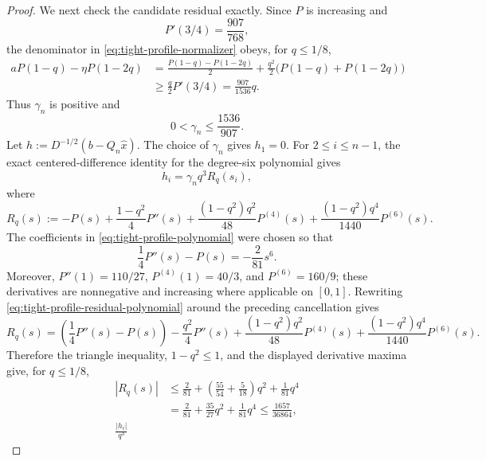 \begin{proof}
We next check the candidate residual exactly.  Since $P$ is increasing and
\begin{equation*}
 P'(3/4)=\frac{907}{768},
\end{equation*}
the denominator in \cref{eq:tight-profile-normalizer} obeys, for $q\leq1/8$,
\begin{align*}
 aP(1-q)-\eta P(1-2q)
 &=\frac{P(1-q)-P(1-2q)}2
   +\frac{q^2}{2}\bigl(P(1-q)+P(1-2q)\bigr)\\
 &\geq\frac q2P'(3/4)=\frac{907}{1536}q.
\end{align*}
Thus $\gamma_n$ is positive and
\begin{equation}
 0<\gamma_n\leq\frac{1536}{907}.
 \label{eq:tight-profile-normalizer-bound}
\end{equation}
Let $h:=D^{-1/2}(b-Q_n\widehat x)$.  The choice of $\gamma_n$ gives
$h_1=0$.  For $2\leq i\leq n-1$, the exact centered-difference identity for
the degree-six polynomial gives
\begin{equation}
 h_i=\gamma_n q^3R_q(s_i),
 \label{eq:tight-profile-interior-residual}
\end{equation}
where
\begin{equation}
 R_q(s):=-P(s)+\frac{1-q^2}{4}P''(s)
       +\frac{(1-q^2)q^2}{48}P^{(4)}(s)
       +\frac{(1-q^2)q^4}{1440}P^{(6)}(s).
 \label{eq:tight-profile-residual-polynomial}
\end{equation}
The coefficients in \cref{eq:tight-profile-polynomial} were chosen so that
\begin{equation*}
 \frac14P''(s)-P(s)=-\frac2{81}s^6.
\end{equation*}
Moreover,
$P''(1)=110/27$, $P^{(4)}(1)=40/3$, and $P^{(6)}=160/9$;
these derivatives are nonnegative and increasing where applicable on
$[0,1]$.  Rewriting \cref{eq:tight-profile-residual-polynomial} around the
preceding cancellation gives
\begin{equation*}
 R_q(s)=\left(\frac14P''(s)-P(s)\right)
       -\frac{q^2}{4}P''(s)
       +\frac{(1-q^2)q^2}{48}P^{(4)}(s)
       +\frac{(1-q^2)q^4}{1440}P^{(6)}(s).
\end{equation*}
Therefore the triangle inequality, $1-q^2\leq1$, and the displayed
derivative maxima give, for $q\leq1/8$,
\begin{align}
 |R_q(s)|
 &\leq\frac2{81}
   +\left(\frac{55}{54}+\frac5{18}\right)q^2
   +\frac1{81}q^4
 \nonumber\\
 &=\frac2{81}+\frac{35}{27}q^2+\frac1{81}q^4
 \leq\frac{1657}{36864},
 \nonumber\\
 \frac{|h_i|}{q^3}

\end{align}
\end{proof}
